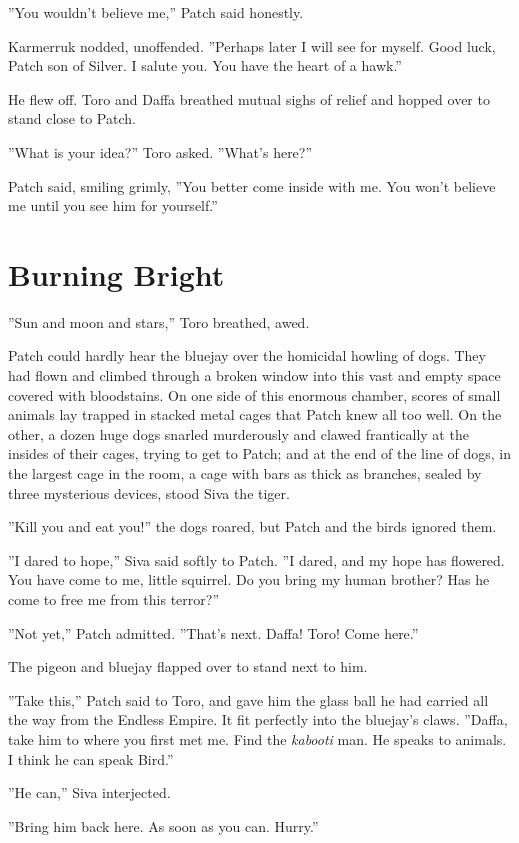 \documentclass[12pt]{book}
\begin{document}
''You wouldn't believe me,'' Patch said honestly.

Karmerruk nodded, unoffended. ''Perhaps later I will see for myself. Good luck, Patch son of Silver. I salute you. You have the heart of a hawk.''

He flew off. Toro and Daffa breathed mutual sighs of relief and hopped over to stand close to Patch.

''What is your idea?'' Toro asked. ''What's here?''

Patch said, smiling grimly, ''You better come inside with me. You won't believe me until you see him for yourself.''


\section{Burning Bright}

''Sun and moon and stars,'' Toro breathed, awed.

Patch could hardly hear the bluejay over the homicidal howling of dogs. They had flown and climbed through a broken window into this vast and empty space covered with bloodstains. On one side of this enormous chamber, scores of small animals lay trapped in stacked metal cages that Patch knew all too well. On the other, a dozen huge dogs snarled murderously and clawed frantically at the insides of their cages, trying to get to Patch; and at the end of the line of dogs, in the largest cage in the room, a cage with bars as thick as branches, sealed by three mysterious devices, stood Siva the tiger.

''Kill you and eat you!'' the dogs roared, but Patch and the birds ignored them.

''I dared to hope,'' Siva said softly to Patch. ''I dared, and my hope has flowered. You have come to me, little squirrel. Do you bring my human brother? Has he come to free me from this terror?''

''Not yet,'' Patch admitted. ''That's next. Daffa! Toro! Come here.''

The pigeon and bluejay flapped over to stand next to him.

''Take this,'' Patch said to Toro, and gave him the glass ball he had carried all the way from the Endless Empire. It fit perfectly into the bluejay's claws. ''Daffa, take him to where you first met me. Find the {\it kabooti} man. He speaks to animals. I think he can speak Bird.''

''He can,'' Siva interjected.

''Bring him back here. As soon as you can. Hurry.''
\end{document}
